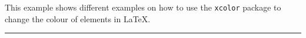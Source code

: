 

This example shows different examples on how to use the \texttt{xcolor} package
to change the colour of elements in \LaTeX.

\noindent
{\color{red} \rule{\linewidth}{0.5mm} }

